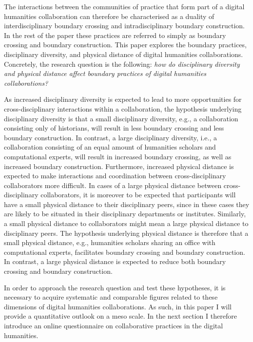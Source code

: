 \documentclass{article}
\begin{document}
The interactions between the communities of practice that form part of a digital humanities collaboration can therefore be characterised as a duality of interdisciplinary boundary crossing and intradisciplinary boundary construction. 
In the rest of the paper these practices are referred to simply as boundary crossing and boundary construction.
This paper explores the boundary practices, disciplinary diversity, and physical distance of digital humanities collaborations. 
Concretely, the research question is the following:
\textit{how do disciplinary diversity and physical distance affect boundary practices of digital humanities collaborations?}


As increased disciplinary diversity is expected to lead to more opportunities for cross-disciplinary interactions within a collaboration, the hypothesis underlying disciplinary diversity is that a small disciplinary diversity, e.g., a collaboration consisting only of historians, will result in less boundary crossing and less boundary construction. 
In contrast, a large disciplinary diversity, i.e., a collaboration consisting of an equal amount of humanities scholars and computational experts,  will result in increased boundary crossing, as well as increased boundary construction.
Furthermore, increased physical distance is expected to make interactions and coordination between cross-disciplinary collaborators more difficult.
In cases of a large physical distance between cross-disciplinary collaborators, it is moreover to be expected that participants will have a small physical distance to their disciplinary peers, since in these cases they are likely to be situated in their disciplinary departments or institutes.
Similarly, a small physical distance to collaborators might mean a large physical distance to disciplinary peers.
The hypothesis underlying physical distance is therefore that a small physical distance, e.g., humanities scholars sharing an office with computational experts, facilitates boundary crossing and boundary construction.
In contrast, a large physical distance is expected to reduce both boundary crossing and boundary construction.

In order to approach the research question and test these hypotheses, 
it is necessary to acquire systematic and comparable figures related to these dimensions of digital humanities collaborations.
As such, in this paper I will provide a quantitative outlook on a meso scale.
In the next section I therefore introduce an online questionnaire on collaborative practices in the digital humanities.
\end{document}
